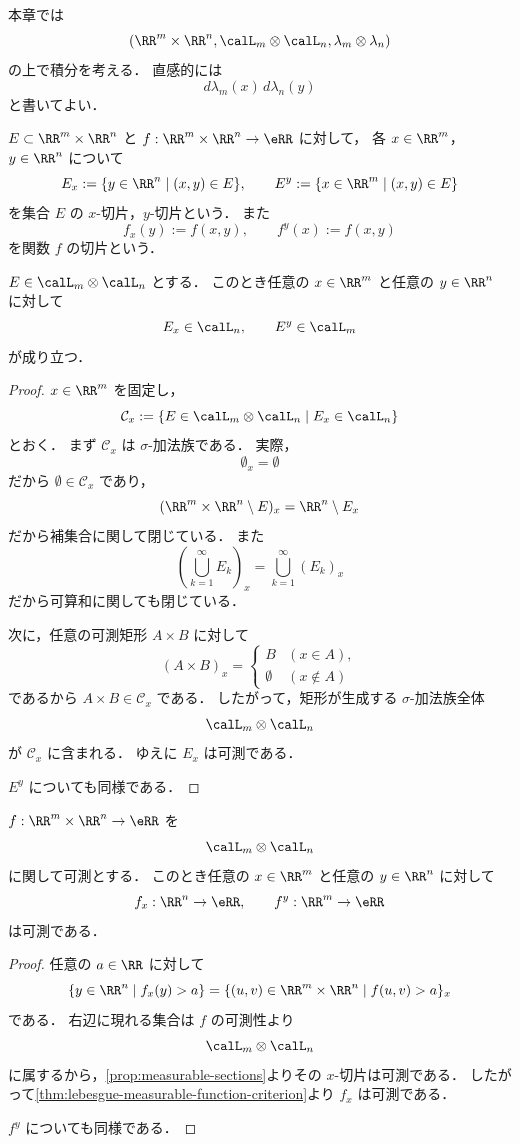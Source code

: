 \begin{remark}
本章では
\[
(\RR^m\times\RR^n,\calL_m\otimes\calL_n,\lambda_m\otimes\lambda_n)
\]
の上で積分を考える．
直感的には
\[
d\lambda_m(x)\,d\lambda_n(y)
\]
と書いてよい．
\end{remark}

\begin{definition}[切片]\label{def:sections}
$E\subset \RR^m\times\RR^n$ と
$f:\RR^m\times\RR^n\to\eRR$ に対して，
各 $x\in\RR^m$，$y\in\RR^n$ について
\[
E_x:=\{y\in\RR^n\mid (x,y)\in E\},
\qquad
E^y:=\{x\in\RR^m\mid (x,y)\in E\}
\]
を集合 $E$ の $x$-切片，$y$-切片という．
また
\[
f_x(y):=f(x,y),
\qquad
f^y(x):=f(x,y)
\]
を関数 $f$ の切片という．
\end{definition}

\begin{proposition}[切片の可測性]\label{prop:measurable-sections}
$E\in \calL_m\otimes\calL_n$ とする．
このとき任意の $x\in\RR^m$ と任意の $y\in\RR^n$ に対して
\[
E_x\in \calL_n,
\qquad
E^y\in \calL_m
\]
が成り立つ．
\end{proposition}
\begin{proof}
$x\in\RR^m$ を固定し，
\[
\mathcal C_x:=\{E\in \calL_m\otimes\calL_n \mid E_x\in\calL_n\}
\]
とおく．
まず $\mathcal C_x$ は $\sigma$-加法族である．
実際，
\[
\emptyset_x=\emptyset
\]
だから $\emptyset\in\mathcal C_x$ であり，
\[
(\RR^m\times\RR^n\setminus E)_x=\RR^n\setminus E_x
\]
だから補集合に関して閉じている．
また
\[
\left(\bigcup_{k=1}^{\infty}E_k\right)_x=\bigcup_{k=1}^{\infty}(E_k)_x
\]
だから可算和に関しても閉じている．

次に，任意の可測矩形 $A\times B$ に対して
\[
(A\times B)_x
=
\begin{cases}
B & (x\in A),\\
\emptyset & (x\notin A)
\end{cases}
\]
であるから $A\times B\in\mathcal C_x$ である．
したがって，矩形が生成する $\sigma$-加法族全体
\[
\calL_m\otimes\calL_n
\]
が $\mathcal C_x$ に含まれる．
ゆえに $E_x$ は可測である．

$E^y$ についても同様である．
\end{proof}

\begin{corollary}[切片関数の可測性]\label{cor:measurable-function-sections}
$f:\RR^m\times\RR^n\to\eRR$ を
\[
\calL_m\otimes\calL_n
\]
に関して可測とする．
このとき任意の $x\in\RR^m$ と任意の $y\in\RR^n$ に対して
\[
f_x:\RR^n\to\eRR,
\qquad
f^y:\RR^m\to\eRR
\]
は可測である．
\end{corollary}
\begin{proof}
任意の $a\in\RR$ に対して
\[
\{y\in\RR^n\mid f_x(y)>a\}
=
\{(u,v)\in\RR^m\times\RR^n\mid f(u,v)>a\}_x
\]
である．
右辺に現れる集合は $f$ の可測性より
\[
\calL_m\otimes\calL_n
\]
に属するから，\cref{prop:measurable-sections}よりその $x$-切片は可測である．
したがって\cref{thm:lebesgue-measurable-function-criterion}より $f_x$ は可測である．

$f^y$ についても同様である．
\end{proof}


